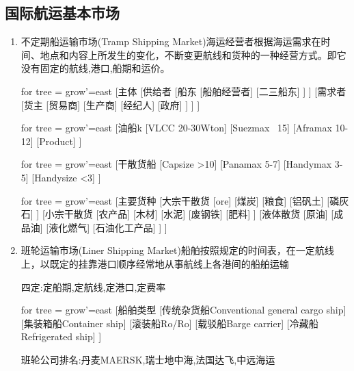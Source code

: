 \documentclass[UTF8,a4paper]{ctexart}
\begin{document}
	\subsection{国际航运基本市场}
	\begin{enumerate}[1)]
		\item 不定期船运输市场(Tramp Shipping Market)海运经营者根据海运需求在时间、地点和内容上所发生的变化，不断变更航线和货种的一种经营方式。即它没有固定的航线,港口,船期和运价。
		
		\begin{forest}
			for tree = {grow'=east}
			[主体 [供给者
					[船东
						[船舶经营者]
						[二三船东]
						]
						]
				  [需求者
				  	 [货主
				  	 	[贸易商]
				  	 	[生产商]
				  	 	[经纪人]
				  	 	[政府]
				  	 	]
				  		]
					]
		\end{forest}
	
		\begin{forest}
			for tree = {grow'=east}
			[油船k [VLCC 20-30Wton]
					[Suezmax ~15]
					[Aframax 10-12]
					[Product]
			]
		\end{forest}
		\begin{forest}
			for tree = {grow'=east}
			[干散货船
				[Capsize >10]
				[Panamax 5-7]
				[Handymax 3-5]
				[Handysize <3]
			]
		\end{forest}
			
		\begin{forest}
			for tree = {grow'=east}
				[主要货种
					[大宗干散货
						[ore]
						[煤炭]
						[粮食]
						[铝矾土]
						[磷灰石]
						]
					[小宗干散货
						[农产品]
						[木材]
						[水泥]
						[废钢铁]
						[肥料]
						]
					[液体散货
						[原油]
						[成品油]
						[液化燃气]
						[石油化工产品]
						]
				]
		\end{forest}

		\item 班轮运输市场(Liner Shipping Market)船舶按照规定的时间表，在一定航线上，以既定的挂靠港口顺序经常地从事航线上各港间的船舶运输
		
		四定:定船期,定航线,定港口,定费率
		
		\begin{forest}
			for tree = {grow'=east}
			[船舶类型
				[传统杂货船Conventional general cargo ship]
				[集装箱船Container ship]
				[滚装船Ro/Ro]
				[载驳船Barge carrier]
				[冷藏船Refrigerated ship]
			]
		\end{forest}
		
		班轮公司排名:丹麦MAERSK,瑞士地中海,法国达飞,中远海运
		

\end{enumerate}
\end{document}
